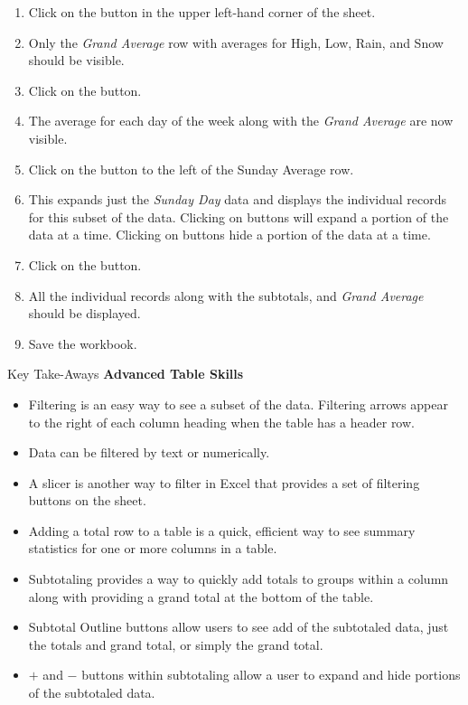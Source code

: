\begin{enumbox}
	\begin{enumerate}
		\item Click on the  button in the upper left-hand corner of the sheet.
		\item Only the \textit{Grand Average} row with averages for High, Low, Rain, and Snow should be visible.
		\item Click on the  button.
		\item The average for each day of the week along with the \textit{Grand Average} are now visible.
		\item Click on the  button to the left of the Sunday Average row.
		\item This expands just the \textit{Sunday Day} data and displays the individual records for this subset of the data. Clicking on  buttons will expand a portion of the data at a time. Clicking on  buttons hide a portion of the data at a time.
		\item Click on the  button.
		\item All the individual records along with the subtotals, and \textit{Grand Average} should be displayed. 
		\item Save the  workbook.
	\end{enumerate}
\end{enumbox}
	
\begin{center}
	\begin{tkwbox}{Key Take-Aways}
		\textbf{Advanced Table Skills}
		\\
		\begin{itemize}
			\setlength{\itemsep}{0pt}
			\setlength{\parskip}{0pt}
			\setlength{\parsep}{0pt}

			\item Filtering is an easy way to see a subset of the data. Filtering arrows appear to the right of each column heading when the table has a header row.
			\item Data can be filtered by text or numerically.
			\item A slicer is another way to filter in Excel that provides a set of filtering buttons on the sheet.
			\item Adding a total row to a table is a quick, efficient way to see summary statistics for one or more columns in a table.
			\item Subtotaling provides a way to quickly add totals to groups within a column along with providing a grand total at the bottom of the table.
			\item Subtotal Outline buttons allow users to see add of the subtotaled data, just the totals and grand total, or simply the grand total.
			\item $ + $ and $ - $ buttons within subtotaling allow a user to expand and hide portions of the subtotaled data.
			
		\end{itemize}
	\end{tkwbox}
\end{center}


